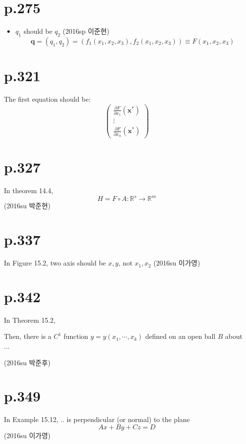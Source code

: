 \documentclass[a4paper]{article}
\begin{document}
\section{p.275} %
\label{sec:p_275}
\begin{itemize}
	\item $q_1$ should be $q_2$ (2016sp 이준현)
	\[
		\mathbf{q}=(q_1,q_2)=\left(f_1(x_1,x_2,x_3),f_2(x_1,x_2,x_3)\right)\equiv F(x_1,x_2,x_3)
	\]
\end{itemize}

\section{p.321}
The first equation should be: \[
\begin{pmatrix}
	\frac{\partial F}{\partial x_1}(\mathbf{x}^\ast)\\
	\vdots\\
	\frac{\partial F}{\partial x_n}(\mathbf{x}^\ast)
\end{pmatrix}
\]

\section{p.327} %
\label{sec:p_327}
In theorem 14.4,
\[
	H = F \circ A : \mathbb{R}^s \rightarrow \mathbb{R}^m
\]
(2016su 박준현)

\section{p.337} %
\label{sec:p_337}
In Figure 15.2, two axis should be $x,y$, not $x_1, x_2$ (2016su 이가영)

\section{p.342} %
\label{sec:p_342}
In Theorem 15.2,

Then, there is a $C^1$ function $y=y(x_1,\cdots,x_k)$ defined on an open ball $B$ about ...

(2016su 박준후)

\section{p.349} %
\label{sec:p_349}
In Example 15.12, .. is perpendicular (or normal) to the plane\[
	Ax+By+Cz=D
\](2016su 이가영)
\end{document}
